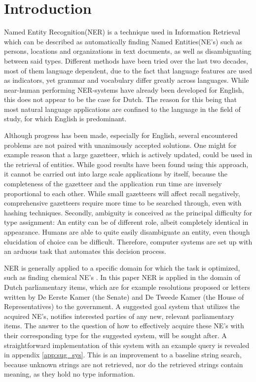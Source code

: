 \section{Introduction} \label{sec:intro}
Named Entity Recognition(NER) is a technique used in Information Retrieval which can be described as automatically finding Named Entities(NE's) such as persons, locations and organizations in text documents, as well as disambiguating between said types. Different methods have been tried over the last two decades, most of them language dependent, due to the fact that language features are used as indicators, yet grammar and vocabulary differ greatly across languages. While near-human performing NER-systems have already been developed for English, this does not appear to be the case for Dutch. The reason for this being that most natural language applications are confined to the language in the field of study, for which English is predominant.  

Although progress has been made, especially for English, several encountered problems are not paired with unanimously accepted solutions. 
One might for example reason that a large gazetteer, which is actively updated, could be used in the retrieval of entities. While good results have been found using this approach, it cannot be carried out into large scale applications by itself, because the completeness of the gazetteer and the application run time are inversely proportional to each other. While small gazetteers will affect recall negatively, comprehensive gazetteers require more time to be searched through, even with hashing techniques. 
Secondly, ambiguity is conceived as the principal difficulty for type assignment: An entity can be of different role, albeit completely identical in appearance. Humans are able to quite easily disambiguate an entity, even though elucidation of choice can be difficult. Therefore, computer systems are set up with an arduous task that automates this decision process.

NER is generally applied to a specific domain for which the task is optimized, such as finding chemical NE's \cite{rocktaschel2012chemspot}. 
In this paper NER is applied in the domain of Dutch parliamentary items, which are for example resolutions proposed or letters written by De Eerste Kamer (the Senate) and De Tweede Kamer (the House of Representatives) to the government. A suggested goal system that utilizes the acquired NE's, notifies interested parties of any new, relevant parliamentary items.
The answer to the question of how to effectively acquire these NE's with their corresponding type for the suggested system, will be sought after. A straightforward implementation of this system with an example query is revealed in appendix \ref{app:sug_sys}.
This is an improvement to a baseline string search, because unknown strings are not retrieved, nor do the retrieved strings contain meaning, as they hold no type information.

